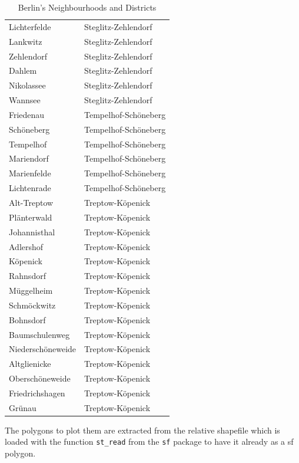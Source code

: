 \begin{table}[H]
\begin{tabular}{ll}
  Lichterfelde & Steglitz-Zehlendorf \\ 
  Lankwitz & Steglitz-Zehlendorf \\ 
  Zehlendorf & Steglitz-Zehlendorf \\ 
  Dahlem & Steglitz-Zehlendorf \\ 
  Nikolassee & Steglitz-Zehlendorf \\ 
  Wannsee & Steglitz-Zehlendorf \\ 
  Friedenau & Tempelhof-Schöneberg \\ 
  Schöneberg & Tempelhof-Schöneberg \\ 
  Tempelhof & Tempelhof-Schöneberg \\ 
  Mariendorf & Tempelhof-Schöneberg \\ 
  Marienfelde & Tempelhof-Schöneberg \\ 
  Lichtenrade & Tempelhof-Schöneberg \\ 
  Alt-Treptow & Treptow-Köpenick \\ 
  Plänterwald & Treptow-Köpenick \\ 
  Johannisthal & Treptow-Köpenick \\ 
  Adlershof & Treptow-Köpenick \\ 
  Köpenick & Treptow-Köpenick \\ 
  Rahnsdorf & Treptow-Köpenick \\ 
  Müggelheim & Treptow-Köpenick \\ 
  Schmöckwitz & Treptow-Köpenick \\ 
  Bohnsdorf & Treptow-Köpenick \\ 
  Baumschulenweg & Treptow-Köpenick \\ 
  Niederschöneweide & Treptow-Köpenick \\ 
  Altglienicke & Treptow-Köpenick \\ 
  Oberschöneweide & Treptow-Köpenick \\ 
  Friedrichshagen & Treptow-Köpenick \\ 
  Grünau & Treptow-Köpenick \\ 
   \hline \hline
\end{tabular}
\caption{Berlin's Neighbourhoods and Districts}
\end{table}

The polygons to plot them are extracted from the relative shapefile which is loaded with the function \texttt{st\_read} from the \texttt{sf} package to have it already as a sf polygon. 



